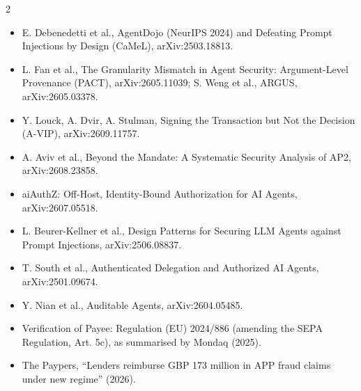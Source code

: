 \documentclass[10pt,a4paper]{article}
\begin{document}
{\begin{multicols}{2}
\begin{itemize}
\item E. Debenedetti et al., AgentDojo (NeurIPS 2024) and Defeating Prompt Injections by Design (CaMeL), arXiv:2503.18813.
\item L. Fan et al., The Granularity Mismatch in Agent Security: Argument-Level Provenance (PACT), arXiv:2605.11039; S. Weng et al., ARGUS, arXiv:2605.03378.
\item Y. Louck, A. Dvir, A. Stulman, Signing the Transaction but Not the Decision (A-VIP), arXiv:2609.11757.
\item A. Aviv et al., Beyond the Mandate: A Systematic Security Analysis of AP2, arXiv:2608.23858.
\item aiAuthZ: Off-Host, Identity-Bound Authorization for AI Agents, arXiv:2607.05518.
\item L. Beurer-Kellner et al., Design Patterns for Securing LLM Agents against Prompt Injections, arXiv:2506.08837.
\item T. South et al., Authenticated Delegation and Authorized AI Agents, arXiv:2501.09674.
\item Y. Nian et al., Auditable Agents, arXiv:2604.05485.
\item Verification of Payee: Regulation (EU) 2024/886 (amending the SEPA Regulation, Art. 5c), as summarised by Mondaq (2025).
\item The Paypers, ``Lenders reimburse GBP 173 million in APP fraud claims under new regime'' (2026).
\end{itemize}
\end{multicols}}
\end{document}
